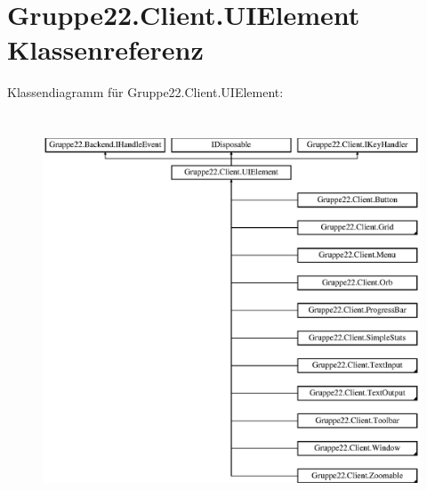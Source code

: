\hypertarget{class_gruppe22_1_1_client_1_1_u_i_element}{\section{Gruppe22.\-Client.\-U\-I\-Element Klassenreferenz}
\label{class_gruppe22_1_1_client_1_1_u_i_element}
}


 


Klassendiagramm für Gruppe22.\-Client.\-U\-I\-Element\-:\begin{figure}[H]
\begin{center}
\leavevmode
\includegraphics[height=11.666667cm]{class_gruppe22_1_1_client_1_1_u_i_element}
\end{center}
\end{figure}
